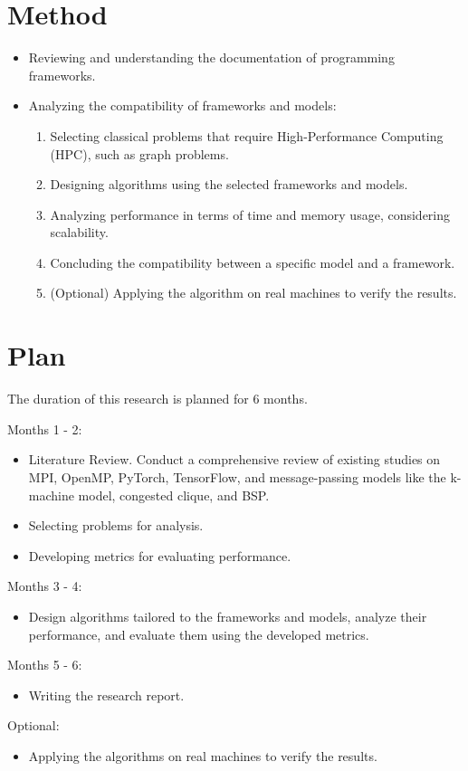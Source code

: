 \documentclass{article}
\begin{document}
\section{Method}
\begin{itemize}
  \item Reviewing and understanding the documentation of programming frameworks.
  \item Analyzing the compatibility of frameworks and models:
      \begin{enumerate}
        \item Selecting classical problems that require High-Performance Computing (HPC), such as graph problems.
        \item Designing algorithms using the selected frameworks and models.
        \item Analyzing performance in terms of time and memory usage, considering scalability.
        \item Concluding the compatibility between a specific model and a framework.
        \item (Optional) Applying the algorithm on real machines to verify the results.
      \end{enumerate}
\end{itemize}

\section{Plan}
The duration of this research is planned for 6 months.

Months 1 - 2:
\begin{itemize}
  \item Literature Review. Conduct a comprehensive review of existing studies on MPI, OpenMP, PyTorch, TensorFlow, and message-passing models like the k-machine model, congested clique, and BSP.
  \item Selecting problems for analysis.
  \item Developing metrics for evaluating performance.
\end{itemize}

Months 3 - 4:
\begin{itemize}
  \item Design algorithms tailored to the frameworks and models, analyze their performance, and evaluate them using the developed metrics.
\end{itemize}

Months 5 - 6:
\begin{itemize}
  \item Writing the research report.
\end{itemize}

Optional:
\begin{itemize}
  \item Applying the algorithms on real machines to verify the results.
\end{itemize}

\medskip
\nocite{*}
\printbibliography
\end{document}

